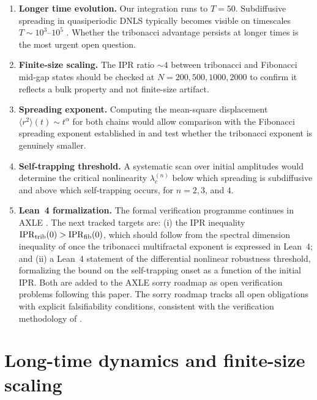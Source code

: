 \documentclass[12pt,a4paper]{article}
\begin{document}
\begin{enumerate}

\item \textbf{Longer time evolution.} Our integration runs to $T = 50$.
Subdiffusive spreading in quasiperiodic DNLS typically becomes visible on
timescales $T \sim 10^3$--$10^5$ \cite{Flach2010}. Whether the tribonacci
advantage persists at longer times is the most urgent open question.

\item \textbf{Finite-size scaling.} The IPR ratio $\sim 4$ between tribonacci
and Fibonacci mid-gap states should be checked at $N = 200, 500, 1000, 2000$
to confirm it reflects a bulk property and not finite-size artifact.

\item \textbf{Spreading exponent.} Computing the mean-square displacement
$\langle r^2 \rangle(t) \sim t^{\alpha}$ for both chains would allow
comparison with the Fibonacci spreading exponent established in
\cite{Lahini2009} and test whether the tribonacci exponent is genuinely
smaller.

\item \textbf{Self-trapping threshold.} A systematic scan over initial
amplitudes would determine the critical nonlinearity $\lambda_c^{(n)}$
below which spreading is subdiffusive and above which self-trapping occurs,
for $n = 2, 3$, and $4$.

\item \textbf{Lean~4 formalization.} The formal verification programme
continues in AXLE \cite{AXLE2026}. The next tracked targets are: (i) the
IPR inequality $\mathrm{IPR}_{\rm trib}(0) > \mathrm{IPR}_{\rm fib}(0)$,
which should follow from the spectral dimension inequality of
\cite{Krebbekx2023} once the tribonacci multifractal exponent is expressed
in Lean~4; and (ii) a Lean~4 statement of the differential nonlinear
robustness threshold, formalizing the bound on the self-trapping onset as a
function of the initial IPR. Both are added to the AXLE sorry roadmap as
open verification problems following this paper. The sorry roadmap tracks
all open obligations with explicit falsifiability conditions, consistent with
the verification methodology of \cite{AXLE2026}.

\end{enumerate}

\section{Long-time dynamics and finite-size scaling}
\label{sec:longtimeFSS}
\end{document}
